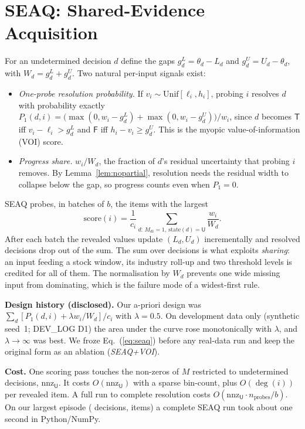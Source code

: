 \documentclass[conference]{IEEEtran}
\newcommand{\seaq}{SEAQ\xspace}
\newcommand{\T}{\textsf{T}\xspace}
\newcommand{\F}{\textsf{F}\xspace}
\newcommand{\U}{\textsf{U}\xspace}
\begin{document}
\section{\seaq: Shared-Evidence Acquisition}
\label{sec:seaq}
For an undetermined decision $d$ define the gaps $g^L_d=\theta_d-L_d$ and $g^U_d=U_d-\theta_d$, with
$W_d=g^L_d+g^U_d$. Two natural per-input signals exist:
\begin{itemize}
\item \emph{One-probe resolution probability.} If $v_i\sim\mathrm{Unif}[\ell_i,h_i]$, probing $i$ resolves $d$
with probability exactly
$P_1(d,i)=\big(\max(0,w_i-g^L_d)+\max(0,w_i-g^U_d)\big)/w_i$, since $d$ becomes $\T$ iff $v_i-\ell_i>g^L_d$ and $\F$
iff $h_i-v_i\ge g^U_d$. This is the myopic value-of-information (VOI) score.
\item \emph{Progress share.} $w_i/W_d$, the fraction of $d$'s residual uncertainty that probing $i$ removes. By
Lemma~\ref{lem:nopartial}, resolution needs the residual width to collapse below the gap, so progress counts even
when $P_1=0$.
\end{itemize}
\seaq{} probes, in batches of $b$, the items with the largest
\begin{equation}
\mathrm{score}(i)=\frac{1}{c_i}\sum_{d:\,M_{di}=1,\ \mathrm{state}(d)=\U}\frac{w_i}{W_d}.
\label{eq:seaq}
\end{equation}
After each batch the revealed values update $(L_d,U_d)$ incrementally and resolved decisions drop out of the sum.
The sum over decisions is what exploits \emph{sharing}: an input feeding a stock window, its industry roll-up and two
threshold levels is credited for all of them. The normalisation by $W_d$ prevents one wide missing input from
dominating, which is the failure mode of a widest-first rule.

\textbf{Design history (disclosed).} Our a-priori design was $\sum_d[P_1(d,i)+\lambda w_i/W_d]/c_i$ with
$\lambda=0.5$. On development data only (synthetic seed~1; DEV\_LOG D1) the area under the curve rose monotonically
with $\lambda$, and $\lambda\to\infty$ was best. We froze Eq.~(\ref{eq:seaq}) before any real-data run and keep the
original form as an ablation (\emph{SEAQ+VOI}).

\textbf{Cost.} One scoring pass touches the non-zeros of $M$ restricted to undetermined decisions,
$\mathrm{nnz}_\U$. It costs $O(\mathrm{nnz}_\U)$ with a sparse bin-count, plus $O(\deg(i))$ per revealed item. A full run to
complete resolution costs $O(\mathrm{nnz}_\U\cdot n_{\text{probes}}/b)$. On our largest episode (\ndecReal{} decisions,
\nitemsReal{} items) a complete \seaq{} run took about one second in Python/NumPy.
\end{document}
